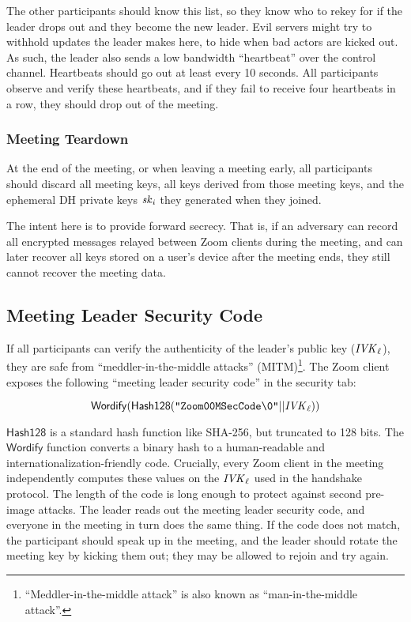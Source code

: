 The other participants should know this list, so they know who to rekey for if the leader drops out and they become the new leader. Evil servers might try to withhold updates the leader makes here, to hide when bad actors are kicked out. As such, the leader also sends a low bandwidth ``heartbeat'' over the control channel. Heartbeats should go out at least every 10 seconds. All participants observe and verify these heartbeats, and if they fail to receive four heartbeats in a row, they should drop out of the meeting.

\subsubsection{Meeting Teardown}
At the end of the meeting, or when leaving a meeting early, all participants should discard all meeting keys, all keys derived from those meeting keys, and the ephemeral DH private keys $\mathit{sk}_i$ they generated when they joined.

The intent here is to provide forward secrecy. That is, if an adversary can record all encrypted messages relayed between Zoom clients during the meeting, and can later recover all keys stored on a user's device after the meeting ends, they still cannot recover the meeting data.

\subsection{Meeting Leader Security Code}
If all participants can verify the authenticity of the leader's public key ($\mathit{IVK}_{\ell}$), they are safe from ``meddler-in-the-middle attacks'' (MITM)\footnote{``Meddler-in-the-middle attack'' is also known as ``man-in-the-middle attack''.}. The Zoom client exposes the following ``meeting leader security code'' in the security tab:

$$\mathsf{Wordify}(\mathsf{Hash128}(\texttt{"Zoom00MSecCode\textbackslash0"} || \mathit{IVK}_{\ell}))$$

$\mathsf{Hash128}$ is a standard hash function like SHA-256, but truncated to 128 bits. The $\mathsf{Wordify}$ function converts a binary hash to a human-readable and internationalization-friendly code. Crucially, every Zoom client in the meeting independently computes these values on the $\mathit{IVK}_{\ell}$ used in the handshake protocol. The length of the code is long enough to protect against second pre-image attacks. The leader reads out the meeting leader security code, and everyone in the meeting in turn does the same thing. If the code does not match, the participant should speak up in the meeting, and the leader should rotate the meeting key by kicking them out; they may be allowed to rejoin and try again.

